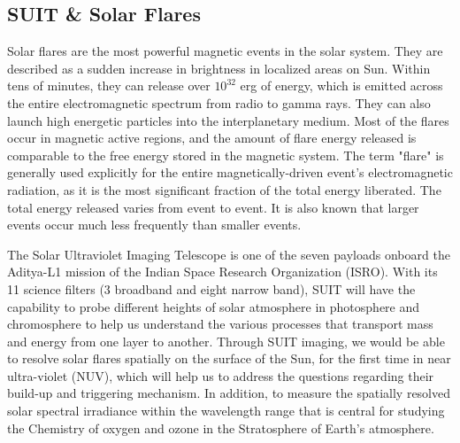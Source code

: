 \subsection{SUIT \& Solar Flares}\label{sec:suit_and_flare}

Solar flares are the most powerful magnetic events in the solar system. They are described as a sudden increase in brightness in localized areas on Sun. Within tens of minutes, they can release over $10^{32}$ erg of energy, which is emitted across the entire electromagnetic spectrum from radio to gamma rays. They can also launch high energetic particles into the interplanetary medium. Most of the flares occur in magnetic active regions, and the amount of flare energy released is comparable to the free energy stored in the magnetic system. The term "flare" is generally used explicitly for the entire magnetically-driven event's electromagnetic radiation, as it is the most significant fraction of the total energy liberated. The total energy released varies from event to event. It is also known that larger events occur much less frequently than smaller events.

The Solar Ultraviolet Imaging Telescope \citep[SUIT;][]{ghosh16,article} is one of the seven payloads onboard the Aditya-L1 mission \citep{adityal1} of the Indian Space Research Organization (ISRO). With its 11 science filters (3 broadband and eight narrow band), SUIT will have the capability to probe different heights of solar atmosphere in photosphere and chromosphere to help us understand the various processes that transport mass and energy from one layer to another. Through SUIT imaging, we would be able to resolve solar flares spatially on the surface of the Sun, for the first time in near ultra-violet (NUV), which will help us to address the questions regarding their build-up and triggering mechanism. In addition, to measure the spatially resolved solar spectral irradiance within the wavelength range that is central for studying the Chemistry of oxygen and ozone in the Stratosphere of Earth's atmosphere.

